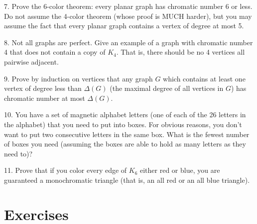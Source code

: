 \documentclass[10pt,]{book}
\theoremstyle{plain}
\theoremstyle{definition}
\numberwithin{equation}{chapter}
\begin{document}
\begin{exerciselist}
\par\smallskip
\item[7.]\hypertarget{exercise-298}{}
		Prove the 6-color theorem: every planar graph has chromatic number 6 or less.  Do not assume the 4-color theorem (whose proof is MUCH harder), but you may assume the fact that every planar graph contains a vertex of degree at most 5.
	\par\smallskip
\item[8.]\hypertarget{exercise-299}{}
Not all graphs are perfect. Give an example of a graph with chromatic number 4 that does not contain a copy of \(K_4\). That is, there should be no 4 vertices all pairwise adjacent.
%
\par\smallskip
\item[9.]\hypertarget{exercise-300}{}
Prove by induction on vertices that any graph \(G\) which contains at least one vertex of degree less than \(\Delta(G)\) (the maximal degree of all vertices in \(G\)) has chromatic number at most \(\Delta(G)\).
%
\par\smallskip
\item[10.]\hypertarget{exercise-301}{}
You have a set of magnetic alphabet letters (one of each of the 26 letters in the alphabet) that you need to put into boxes. For obvious reasons, you don't want to put two consecutive letters in the same box. What is the fewest number of boxes you need (assuming the boxes are able to hold as many letters as they need to)?
%
\par\smallskip
\item[11.]\hypertarget{exercise-302}{}
Prove that if you color every edge of \(K_6\) either red or blue, you are guaranteed a monochromatic triangle (that is, an all red or an all blue triangle).
%
\par\smallskip
\end{exerciselist}
\typeout{************************************************}
\typeout{************************************************}
\section[Exercises]{Exercises}\label{section-24}
\typeout{************************************************}
\typeout{************************************************}
\end{document}
